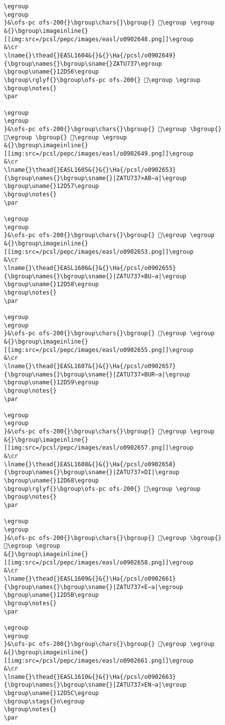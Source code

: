 \begin{verbatim}
\egroup
\egroup
}&\ofs-pc ofs-200{}\bgroup\chars{}\bgroup{} 𒵕\egroup \egroup
&{}\bgroup\imageinline{}[[img:src=/pcsl/pepc/images/easl/o0902648.png]]\egroup
&\cr
\lname{}\thead{}EASL1604&{}&{}\Ha{/pcsl/o0902649}{\bgroup\names{}\bgroup\sname{}ZATU737\egroup
\bgroup\uname{}12D56\egroup
\bgroup\rglyf{}\bgroup\ofs-pc ofs-200{} 𒵖\egroup \egroup
\bgroup\notes{}
\par 

\egroup
\egroup
}&\ofs-pc ofs-200{}\bgroup\chars{}\bgroup{} 𒵖\egroup \bgroup{} 𒵤\egroup \bgroup{} 𒵧\egroup \egroup
&{}\bgroup\imageinline{}[[img:src=/pcsl/pepc/images/easl/o0902649.png]]\egroup
&\cr
\lname{}\thead{}EASL1605&{}&{}\Ha{/pcsl/o0902653}{\bgroup\names{}\bgroup\sname{}|ZATU737×AB∼a|\egroup
\bgroup\uname{}12D57\egroup
\bgroup\notes{}
\par 

\egroup
\egroup
}&\ofs-pc ofs-200{}\bgroup\chars{}\bgroup{} 𒵗\egroup \egroup
&{}\bgroup\imageinline{}[[img:src=/pcsl/pepc/images/easl/o0902653.png]]\egroup
&\cr
\lname{}\thead{}EASL1606&{}&{}\Ha{/pcsl/o0902655}{\bgroup\names{}\bgroup\sname{}|ZATU737×BU∼a|\egroup
\bgroup\uname{}12D58\egroup
\bgroup\notes{}
\par 

\egroup
\egroup
}&\ofs-pc ofs-200{}\bgroup\chars{}\bgroup{} 𒵘\egroup \egroup
&{}\bgroup\imageinline{}[[img:src=/pcsl/pepc/images/easl/o0902655.png]]\egroup
&\cr
\lname{}\thead{}EASL1607&{}&{}\Ha{/pcsl/o0902657}{\bgroup\names{}\bgroup\sname{}|ZATU737×BUR∼a|\egroup
\bgroup\uname{}12D59\egroup
\bgroup\notes{}
\par 

\egroup
\egroup
}&\ofs-pc ofs-200{}\bgroup\chars{}\bgroup{} 𒵙\egroup \egroup
&{}\bgroup\imageinline{}[[img:src=/pcsl/pepc/images/easl/o0902657.png]]\egroup
&\cr
\lname{}\thead{}EASL1608&{}&{}\Ha{/pcsl/o0902658}{\bgroup\names{}\bgroup\sname{}|ZATU737×DI|\egroup
\bgroup\uname{}12D68\egroup
\bgroup\rglyf{}\bgroup\ofs-pc ofs-200{} 𒵨\egroup \egroup
\bgroup\notes{}
\par 

\egroup
\egroup
}&\ofs-pc ofs-200{}\bgroup\chars{}\bgroup{} 𒵚\egroup \bgroup{} 𒵨\egroup \egroup
&{}\bgroup\imageinline{}[[img:src=/pcsl/pepc/images/easl/o0902658.png]]\egroup
&\cr
\lname{}\thead{}EASL1609&{}&{}\Ha{/pcsl/o0902661}{\bgroup\names{}\bgroup\sname{}|ZATU737×E∼a|\egroup
\bgroup\uname{}12D5B\egroup
\bgroup\notes{}
\par 

\egroup
\egroup
}&\ofs-pc ofs-200{}\bgroup\chars{}\bgroup{} 𒵛\egroup \egroup
&{}\bgroup\imageinline{}[[img:src=/pcsl/pepc/images/easl/o0902661.png]]\egroup
&\cr
\lname{}\thead{}EASL1610&{}&{}\Ha{/pcsl/o0902663}{\bgroup\names{}\bgroup\sname{}|ZATU737×EN∼a|\egroup
\bgroup\uname{}12D5C\egroup
\bgroup\stags{}n\egroup
\bgroup\notes{}
\par 


\end{verbatim}
